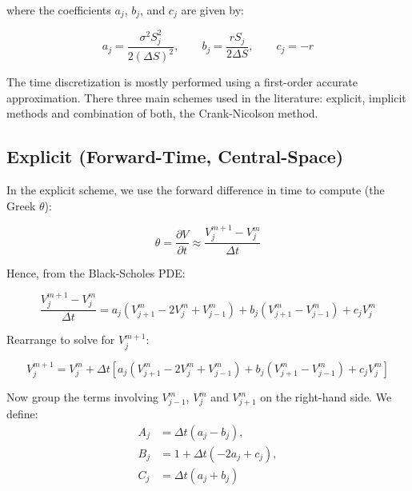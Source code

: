     where the coefficients $a_{j}$, $b_{j}$, and $c_{j}$ are given by:

    \begin{equation}
            a_j = \frac{\sigma^2 S_{j}^2}{2(\Delta S)^2},  \qquad
            b_j = \frac{r S_j}{2 \Delta S}, \qquad
            c_j = -r
        \label{eq:coefficients}
    \end{equation}

    The time discretization is mostly performed using a first-order accurate approximation. There three main schemes
    used in the literature: explicit, implicit methods and combination of both, the Crank-Nicolson method.

    \subsection{Explicit (Forward-Time, Central-Space)}
    \label{sec:explicit}

    In the explicit scheme, we use the forward difference in time to compute (the Greek $\theta$):

    \begin{equation}
        \theta = \frac{\partial V}{\partial t} \approx \frac{V_j^{m+1} - V_j^m}{\Delta t}
        \label{eq:forward_diff}
    \end{equation}

    Hence, from the Black-Scholes PDE:

    \begin{equation}
        \frac{V_j^{m+1} - V_j^m}{\Delta t} =
            a_j \left(V_{j+1}^m - 2V_j^m + V_{j-1}^m\right) + b_j \left(V_{j+1}^m - V_{j-1}^m\right) + c_j V_j^m
        \label{eq:explicit_scheme}
    \end{equation}

    Rearrange to solve for $V_j^{m+1}$:

    \begin{equation}
        V_j^{m+1} =
            V_j^m
            + \Delta t \left[
                a_j \left(V_{j+1}^m - 2V_j^m + V_{j-1}^m\right)
                + b_j \left(V_{j+1}^m - V_{j-1}^m\right)
                + c_j V_j^m
            \right]
        \label{eq:explicit_scheme_rearranged}
    \end{equation}

    Now group the terms involving $V_{j-1}^m$, $V_j^m$ and $V_{j+1}^m$ on the right-hand side.
    We define:
    \begin{equation*}
        \begin{aligned}
            A_j &= \Delta t \left(a_j - b_j\right), \\
            B_j &= 1 + \Delta t \left(-2a_j + c_j\right),\\
            C_j &= \Delta t \left(a_j + b_j\right)
        \end{aligned}
        \label{eq:abc}
    \end{equation*}

